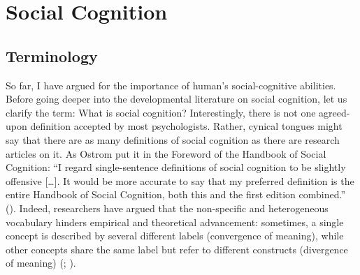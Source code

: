 \documentclass[
]{scrbook}
\begin{document}
\section{Social Cognition}\label{social-cognition}

\subsection{Terminology}\label{terminology}

So far, I have argued for the importance of human's social-cognitive abilities. Before going deeper into the developmental literature on social cognition, let us clarify the term: What is social cognition? Interestingly, there is not one agreed-upon definition accepted by most psychologists. Rather, cynical tongues might say that there are as many definitions of social cognition as there are research articles on it. As Ostrom put it in the Foreword of the Handbook of Social Cognition: ``I regard single-sentence definitions of social cognition to be slightly offensive {[}\ldots{]}. It would be more accurate to say that my preferred definition is the entire Handbook of Social Cognition, both this and the first edition combined.'' (). Indeed, researchers have argued that the non-specific and heterogeneous vocabulary hinders empirical and theoretical advancement: sometimes, a single concept is described by several different labels (convergence of meaning), while other concepts share the same label but refer to different constructs (divergence of meaning) (; ).
\end{document}
